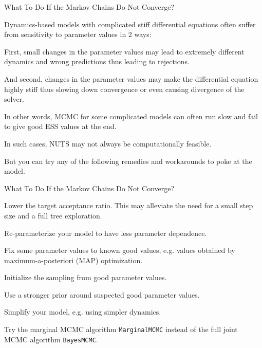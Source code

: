 \begin{frame}{What To Do If the Markov Chains Do Not Converge?}
    \begin{vfilleditems}
        \item Dynamics-based models with complicated stiff differential equations often suffer from sensitivity to parameter values in 2 ways:
            \begin{vfilleditems}
                \item First, small changes in the parameter values may lead to extremely different dynamics and wrong predictions thus leading to rejections.
                \item And second, changes in the parameter values may make the differential equation highly stiff thus slowing down convergence or even causing divergence of the solver.
            \end{vfilleditems}
        \item In other words, MCMC for some complicated models can often run slow and fail to give good ESS values at the end.
        \item In such cases, NUTS may not always be computationally feasible.
        \item But you can try any of the following remedies and workarounds to poke at the model.
    \end{vfilleditems}
\end{frame}

\begin{frame}{What To Do If the Markov Chains Do Not Converge?}
    \begin{vfilleditems}
        \item Lower the target acceptance ratio. This may alleviate the need for a small step size and a full tree exploration.
        \item Re-parameterize your model to have less parameter dependence.
        \item Fix some parameter values to known good values, e.g. values obtained by maximum-a-posteriori (MAP) optimization.
        \item Initialize the sampling from good parameter values.
        \item Use a stronger prior around suspected good parameter values.
        \item Simplify your model, e.g. using simpler dynamics.
        \item Try the marginal MCMC algorithm \lstinline{MarginalMCMC} instead of the full joint MCMC algorithm \lstinline{BayesMCMC}.
    \end{vfilleditems}
\end{frame}

